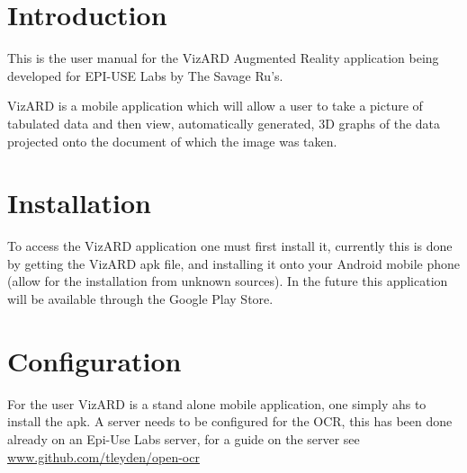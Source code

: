 \documentclass[a4paper,12pt]{article}
\begin{document}
\newpage

\tableofcontents

\newpage

\section{Introduction}

This is the user manual for the VizARD Augmented Reality application being developed for EPI-USE Labs by The Savage Ru's.

VizARD is a mobile application which will allow a user to take a picture of tabulated data and then view, automatically generated, 3D graphs of the data projected onto the document of which the image was taken.



\section{Installation}
To access the VizARD application one must first install it, currently this is done by getting the VizARD apk file, and installing it onto your Android mobile phone (allow for the installation from unknown sources). In the future this application will be available through the Google Play Store.

\section{Configuration}
For the user VizARD is a stand alone mobile application, one simply ahs to install the apk. A server needs to be configured for the OCR, this has been done already on an Epi-Use Labs server, for a guide on the server see \url{www.github.com/tleyden/open-ocr}
\end{document}

